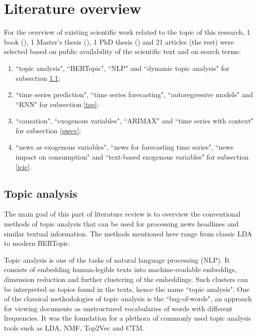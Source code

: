 \documentclass[3p,times,procedia]{elsarticle}
\begin{document}

\section{Literature overview}

\setlength{\belowdisplayskip}{12pt} \setlength{\belowdisplayshortskip}{7pt}
\setlength{\abovedisplayskip}{12pt} \setlength{\abovedisplayshortskip}{7pt}

For the overview of existing scientific work related to the topic of this research, 1 book (\cite{loughran2011liability}), 1 Master's thesis (\cite{ding2021empirical}), 1 PhD thesis (\cite{jeong2022predicting}) and 21 articles (the rest) were selected based on public availability of the scientific text and on search terms:
\begin{enumerate}
	\item ``topic analysis", ``BERTopic", ``NLP" and ``dynamic topic analysis" for subsection \ref{ta};
	\item ``time series prediction", ``time series forecasting", ``autoregressive models" and ``RNN" for subsection \ref{tsp};
	\item ``causation", ``exogenous variables", ``ARIMAX" and ``time series with context" for subsection \ref{pwev};
	\item ``news as exogenous variables", ``news for forecasting time series", ``news impact on consumption" and ``text-based exogenous variables" for subsection \ref{icic}.
\end{enumerate}

\subsection{Topic analysis} \label{ta}

The main goal of this part of literature review is to overview the conventional methods of topic analysis that can be used for processing news headlines and similar textual information. The methods mentioned here range from classic LDA to modern BERTopic.

Topic analysis is one of the tasks of natural language processing (NLP). It consists of embedding human-legible texts into machine-readable embeddigs, dimension reduction and further clustering of the embeddings. Such clusters can be interpreted as topics found in the texts, hence the name ``topic analysis". One of the classical methodologies of topic analysis is the ``bag-of-words", an approach for viewing documents as unstructured vocabularies of words with different frequencies. It was the foundation for a plethora of commonly used topic analysis tools such as LDA, NMF, Top2Vec and CTM.
\end{document}
